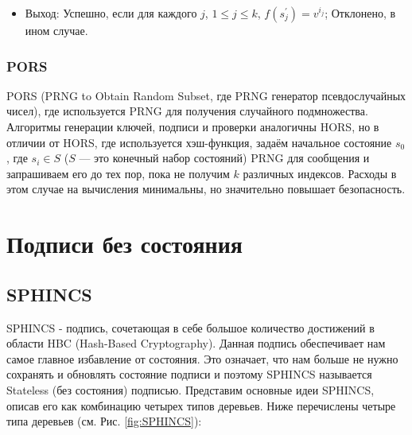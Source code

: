 \documentclass[a4paper, 14pt]{extarticle}
\begin{document}
\begin{itemize}
\begin{itemize}
        \item Выход: Успешно, если для каждого $j$, $1 \leq j \leq k$, $f(s^{'}_{j}) = v^{i_{j}}$; Отклонено, в ином случае.
    \end{itemize}

\end{itemize}

\subsubsection{PORS}
PORS (PRNG to Obtain Random Subset, где PRNG генератор псевдослучайных чисел), где используется PRNG для получения случайного подмножества. Алгоритмы генерации ключей, подписи и проверки аналогичны HORS, но в отличии от HORS, где используется хэш-функция, задаём начальное состояние $s_{0}$, где $s_{i} \in S$ ($S$ --- это конечный набор состояний) PRNG для сообщения и запрашиваем его до тех пор, пока не получим $k$ различных индексов. Расходы в этом случае на вычисления минимальны, но значительно повышает безопасность.

\section{Подписи без состояния}
\subsection{SPHINCS}
SPHINCS \cite{stateless} - подпись, сочетающая в себе большое количество достижений в области HBC (Hash-Based Cryptography). Данная подпись обеспечивает нам самое главное избавление от состояния. Это означает, что нам больше не нужно сохранять и обновлять состояние подписи и поэтому SPHINCS называется Stateless (без состояния) подписью.
Представим основные идеи SPHINCS, описав его как комбинацию четырех типов деревьев. Ниже перечислены четыре типа деревьев (см. Рис. \ref{fig:SPHINCS}):
\end{document}
